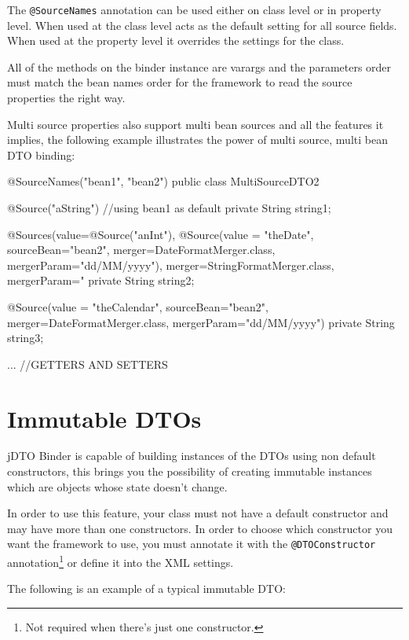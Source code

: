 \documentclass[11pt]{article}
\newcommand{\JDTO}{jDTO Binder\xspace}
\begin{document}
The \texttt{@SourceNames} annotation can be used either on class level or in property level. When used at the class level acts as the default setting for all source fields. When used at the property level it overrides the settings for the class.

All of the methods on the binder instance are varargs and the parameters order must match the bean names order for the framework to read the source properties the right way.

Multi source properties also support multi bean sources and all the features it implies, the following example illustrates the power of multi source, multi bean DTO binding:


\begin{java}
@SourceNames({"bean1", "bean2"})
public class MultiSourceDTO2 {
    @Source("aString") //using bean1 as default
    private String string1;
    
    @Sources(value={@Source("anInt"), 
            @Source(value = "theDate", 
            sourceBean="bean2", 
            merger=DateFormatMerger.class, 
            mergerParam="dd/MM/yyyy")}, 
        merger=StringFormatMerger.class, mergerParam="%
    private String string2;
    
    @Source(value = "theCalendar", sourceBean="bean2", 
        merger=DateFormatMerger.class, mergerParam="dd/MM/yyyy")
    private String string3;

    ... //GETTERS AND SETTERS
}
\end{java}

\section{Immutable DTOs}

\JDTO is capable of building instances of the DTOs using non default constructors, this brings you the possibility of creating immutable instances which
 are objects whose state doesn't change.
 
In order to use this feature, your class must not have a default constructor and may have more than one constructors. In order to choose which constructor you want the framework to use, you must annotate it with the \texttt{@DTOConstructor} annotation\footnote{Not required when there's just one constructor.} or define it into the XML settings.

The following is an example of a typical immutable DTO:
\end{document}
